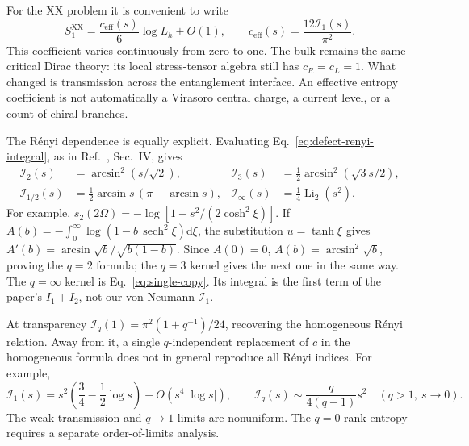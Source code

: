 \documentclass[aps,prb,onecolumn,nofootinbib,superscriptaddress]{revtex4-2}
\newcommand{\dd}{\mathrm{d}}
\begin{document}
For the XX problem it is convenient to write
\begin{equation}
 S_1^{\mathrm{XX}}=\frac{c_{\mathrm{eff}}(s)}6\log L_h+O(1),
 \qquad c_{\mathrm{eff}}(s)=\frac{12\mathcal I_1(s)}{\pi^2}.
 \label{eq:defect-ceff}
\end{equation}
This coefficient varies continuously from zero to one. The bulk remains
the same critical Dirac theory: its local stress-tensor algebra still
has $c_R=c_L=1$. What changed is transmission across the entanglement
interface. An effective entropy coefficient is not automatically a
Virasoro central charge, a current level, or a count of chiral branches.

The Rényi dependence is equally explicit. Evaluating
Eq.~\eqref{eq:defect-renyi-integral}, as in
Ref.~\cite{PeschelEisler2012}, Sec.~IV, gives
\begin{align}
 \mathcal I_2(s)&=\arcsin^2(s/\sqrt2),&
 \mathcal I_3(s)&=\frac12\arcsin^2(\sqrt3s/2),\nonumber\\
 \mathcal I_{1/2}(s)&=\frac12\arcsin s\,(\pi-\arcsin s),&
 \mathcal I_\infty(s)&=\frac14\operatorname{Li}_2(s^2).
 \label{eq:defect-renyi-examples}
\end{align}
For example, $s_2(2\Omega)=-\log[1-s^2/(2\cosh^2\xi)]$.
If $A(b)=-\int_0^\infty\log(1-b\,\operatorname{sech}^2\xi)\dd\xi$,
the substitution $u=\tanh\xi$ gives
$A'(b)=\arcsin\sqrt b/\sqrt{b(1-b)}$. Since $A(0)=0$,
$A(b)=\arcsin^2\sqrt b$, proving the $q=2$ formula; the $q=3$ kernel
gives the next one in the same way. The $q=\infty$ kernel is
Eq.~\eqref{eq:single-copy}. Its integral is the first term of the
paper's $I_1+I_2$, not our von Neumann $\mathcal I_1$.

At transparency
$\mathcal I_q(1)=\pi^2(1+q^{-1})/24$, recovering the homogeneous
Rényi relation. Away from it, a single $q$-independent replacement of
$c$ in the homogeneous formula does not in general reproduce all
Rényi indices. For example,
\begin{equation}
 \mathcal I_1(s)=s^2\left(\frac34-\frac12\log s\right)
                   +O(s^4|\log s|),\qquad
 \mathcal I_q(s)\sim\frac{q}{4(q-1)}s^2
                   \quad(q>1,\ s\to0).
 \label{eq:defect-small-s}
\end{equation}
The weak-transmission and $q\to1$ limits are nonuniform.
The $q=0$ rank entropy requires a separate order-of-limits analysis.
\end{document}

